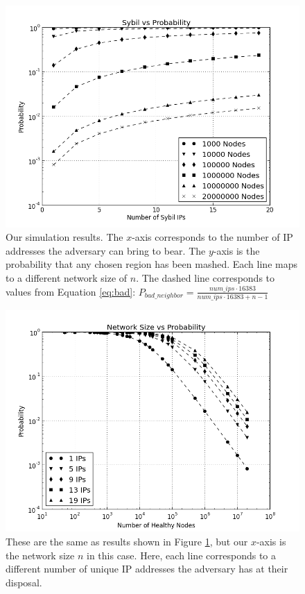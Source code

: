 \begin{figure}
	\centering
	\includegraphics[width=1\linewidth]{figs/ip_prob_all}
	\caption[foo]{Our simulation results.  
		The $x$-axis corresponds to the number of IP addresses the adversary can bring to bear.
		The $y$-axis is the probability that any chosen region has been mashed.
		Each line maps to a different network size of $n$.
		The dashed line corresponds to values from Equation \ref{eq:bad}: $ P_{bad\_neighbor} =  \frac{num\_ips \cdot 16383}{num\_ips \cdot 16383 + n - 1}$}
	\label{fig:exp2}
\end{figure}


\begin{figure}
	\centering
	\includegraphics[width=\linewidth]{figs/size_prob_all}
	\caption[a]{These are the same as results shown in Figure \ref{fig:exp2}, but our $x$-axis is the network size $n$ in this case.  
		Here, each line corresponds to a different number of unique IP addresses the adversary has at their disposal.}
	\label{fig:size_prob_all}
\end{figure}



